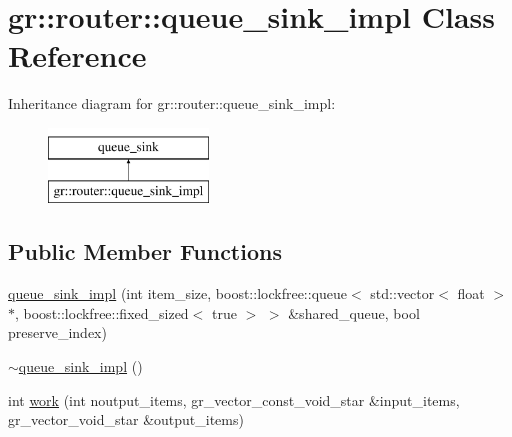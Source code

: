 \hypertarget{classgr_1_1router_1_1queue__sink__impl}{\section{gr\+:\+:router\+:\+:queue\+\_\+sink\+\_\+impl Class Reference}
\label{classgr_1_1router_1_1queue__sink__impl}
}
Inheritance diagram for gr\+:\+:router\+:\+:queue\+\_\+sink\+\_\+impl\+:\begin{figure}[H]
\begin{center}
\leavevmode
\includegraphics[height=2.000000cm]{classgr_1_1router_1_1queue__sink__impl}
\end{center}
\end{figure}
\subsection*{Public Member Functions}
\begin{DoxyCompactItemize}
\item 
\hyperlink{classgr_1_1router_1_1queue__sink__impl_aacd0fcad3ffba928c2782cc385c444d3}{queue\+\_\+sink\+\_\+impl} (int item\+\_\+size, boost\+::lockfree\+::queue$<$ std\+::vector$<$ float $>$ $\ast$, boost\+::lockfree\+::fixed\+\_\+sized$<$ true $>$ $>$ \&shared\+\_\+queue, bool preserve\+\_\+index)
\item 
\hyperlink{classgr_1_1router_1_1queue__sink__impl_ac503d2c10e679dd10c6ab4a6762dd22f}{$\sim$queue\+\_\+sink\+\_\+impl} ()
\item 
int \hyperlink{classgr_1_1router_1_1queue__sink__impl_a5762ae13eb5b07e1925e2e7266a33436}{work} (int noutput\+\_\+items, gr\+\_\+vector\+\_\+const\+\_\+void\+\_\+star \&input\+\_\+items, gr\+\_\+vector\+\_\+void\+\_\+star \&output\+\_\+items)
\end{DoxyCompactItemize}


